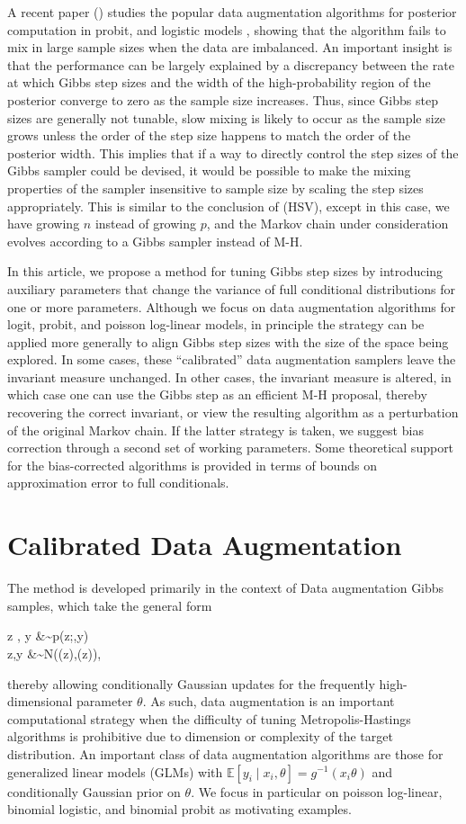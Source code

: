 \documentclass[10pt]{article}
\newcommand{\be}{\begin{equs}}
\newcommand{\ee}{\end{equs}}
\newcommand{\bb}[1]{\mathbb{#1}}
\begin{document}
A recent paper (\cite{johndrow2016inefficiency}) studies the popular data augmentation algorithms for posterior computation in probit, \citep{albert1993bayesian} and logistic models \citep{polson2013bayesian}, showing that the algorithm fails to mix in large sample sizes when the data are imbalanced. An important insight is that the performance can be largely explained by a discrepancy between the rate at which Gibbs step sizes and the width of the high-probability region of the posterior converge to zero as the sample size increases. Thus, since Gibbs step sizes are generally not tunable, slow mixing is likely to occur as the sample size grows unless the order of the step size happens to match the order of the posterior width. This implies that if a way to directly control the step sizes of the Gibbs sampler could be devised, it would be possible to make the mixing properties of the sampler insensitive to sample size by scaling the step sizes appropriately. This is similar to the conclusion of (HSV), except in this case, we have growing $n$ instead of growing $p$, and the Markov chain under consideration evolves according to a Gibbs sampler instead of M-H.

In this article, we propose a method for tuning Gibbs step sizes by introducing auxiliary parameters that change the variance of full conditional distributions for one or more parameters. Although we focus on data augmentation algorithms for logit, probit, and poisson log-linear models, in principle the strategy can be applied more generally to align Gibbs step sizes with the size of the space being explored. In some cases, these ``calibrated'' data augmentation samplers leave the invariant measure unchanged. In other cases, the invariant measure is altered, in which case one can use the Gibbs step as an efficient M-H proposal, thereby recovering the correct invariant, or view the resulting algorithm as a perturbation of the original Markov chain. If the latter strategy is taken, we suggest bias correction through a second set of working parameters. Some theoretical support for the bias-corrected algorithms is provided in terms of bounds on approximation error to full conditionals. 

\section{Calibrated Data Augmentation}
The method is developed primarily in the context of Data augmentation Gibbs samples, which take the general form
\be \label{eq:da}
z \mid \theta, y &\sim p(z;\theta,y) \\
\theta \mid z,y &\sim N(\mu(z),\Sigma(z)),
\ee
thereby allowing conditionally Gaussian updates for the frequently high-dimensional parameter $\theta$. As such, data augmentation is an important computational strategy when the difficulty of tuning Metropolis-Hastings algorithms is prohibitive due to dimension or complexity of the target distribution. An important class of data augmentation algorithms are those for generalized linear models (GLMs) with $\bb E[y_i \mid x_i, \theta] = g^{-1}(x_i \theta)$ and conditionally Gaussian prior on $\theta$. We focus in particular on poisson log-linear, binomial logistic, and binomial probit as motivating examples.
\end{document}
